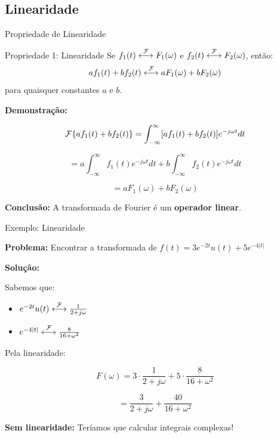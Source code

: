 
\subsection{Linearidade}

\begin{frame}{Propriedade de Linearidade}

\begin{block}{Propriedade 1: Linearidade}
Se $f_1(t) \mathrel{\overset{\mathcal{F}}{\longleftrightarrow}} F_1(\omega)$ e $f_2(t) \mathrel{\overset{\mathcal{F}}{\longleftrightarrow}} F_2(\omega)$, então:
\[
af_1(t) + bf_2(t) \mathrel{\overset{\mathcal{F}}{\longleftrightarrow}} aF_1(\omega) + bF_2(\omega)
\]
para quaisquer constantes $a$ e $b$.
\end{block}

\textbf{Demonstração:}

\[
\mathcal{F}\{af_1(t) + bf_2(t)\} = \int_{-\infty}^{\infty} [af_1(t) + bf_2(t)] e^{-j\omega t} dt
\]

\[
= a\int_{-\infty}^{\infty} f_1(t) e^{-j\omega t} dt + b\int_{-\infty}^{\infty} f_2(t) e^{-j\omega t} dt
\]

\[
= aF_1(\omega) + bF_2(\omega)
\]

\textbf{Conclusão:} A transformada de Fourier é um \textbf{operador linear}.

\end{frame}


\begin{frame}{Exemplo: Linearidade}

\textbf{Problema:} Encontrar a transformada de $f(t) = 3e^{-2t}u(t) + 5e^{-4|t|}$

\textbf{Solução:}

Sabemos que:
\begin{itemize}
\item $e^{-2t}u(t) \mathrel{\overset{\mathcal{F}}{\longleftrightarrow}} \frac{1}{2+j\omega}$
\item $e^{-4|t|} \mathrel{\overset{\mathcal{F}}{\longleftrightarrow}} \frac{8}{16+\omega^2}$
\end{itemize}

Pela linearidade:

\[
F(\omega) = 3 \cdot \frac{1}{2+j\omega} + 5 \cdot \frac{8}{16+\omega^2}
\]

\[
= \frac{3}{2+j\omega} + \frac{40}{16+\omega^2}
\]

\textbf{Sem linearidade:} Teríamos que calcular integrais complexas!

\end{frame}


